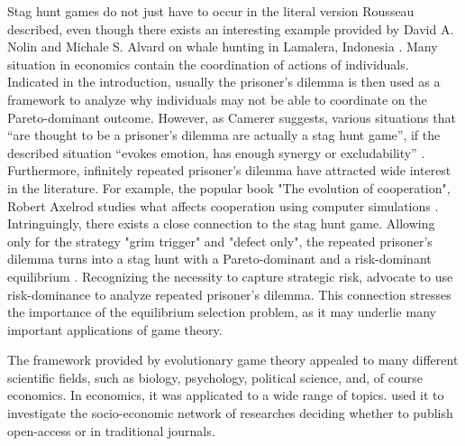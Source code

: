 

Stag hunt games do not just have to occur in the literal version Rousseau
described, even though there exists an interesting example provided by 
David A. Nolin and Michale S. Alvard on whale hunting in Lamalera, Indonesia
\parencite{nolin_meat-sharing_2000}.
Many situation in economics contain the coordination of actions
of individuals. Indicated in the introduction, usually the prisoner's dilemma 
is then used as a framework to analyze why individuals may not be able to 
coordinate on the Pareto-dominant outcome. However, as Camerer
suggests, various situations that ``are thought to be a prisoner's dilemma 
are actually a stag hunt game'', if the described situation ``evokes emotion,
has enough synergy or excludability'' 
\parencite[376-377]{camerer_behavioral_2003}. 
Furthermore, infinitely repeated prisoner's dilemma 
have attracted wide interest in the literature. 
For example, the popular book "The evolution of cooperation", 
Robert Axelrod studies what affects cooperation 
using computer simulations \textcite{axelrod_evolution_2006}. 
Intringuingly, there
exists a close connection to the stag hunt game. Allowing only 
for the strategy "grim trigger" and "defect only", the repeated prisoner's
dilemma turns into a stag hunt with a Pareto-dominant and a risk-dominant
equilibrium \parencite{blonski_prisoners_2015}. 
Recognizing the necessity to capture strategic risk, 
\textcite{blonski_prisoners_2015} advocate to use risk-dominance
to analyze repeated prisoner's dilemma. 
This connection stresses the importance of the equilibrium selection
problem, as it may underlie many important applications of game theory.

The framework provided by evolutionary game theory appealed to many different
scientific fields, such as biology, psychology, political science, and, 
of course economics. In economics, it was applicated to a wide range of 
topics. \textcite{hanauske_evolutionare_2011} used it to investigate the
socio-economic network of researches deciding whether to publish open-access
or in traditional journals.

